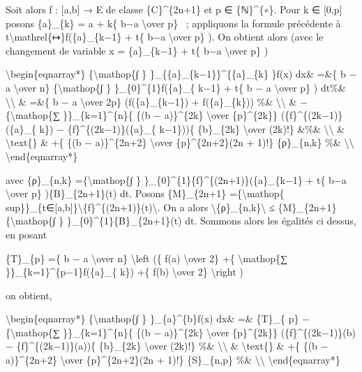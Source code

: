 \documentclass[]{article}
\begin{document}
Soit alors f : {[}a,b{]} → E de classe \{C\}\^{}\{2n+1\} et p ∈
\{ℕ\}\^{}\{∗\}. Pour k ∈ {[}0,p{]} posons \{a\}\_\{k\} = a + k\{ b−a
\textbackslash{}over p\} ~; appliquons la formule précédente à
t\textbackslash{}mathrel\{↦\}f(\{a\}\_\{k−1\} + t\{ b−a
\textbackslash{}over p\} ). On obtient alors (avec le changement de
variable x = \{a\}\_\{k−1\} + t\{ b−a \textbackslash{}over p\} )

\textbackslash{}begin\{eqnarray*\} \{\textbackslash{}mathop\{∫ \}
\}\_\{\{a\}\_\{k−1\}\}\^{}\{\{a\}\_\{k\} \}f(x) dx\& =\&\{ b − a
\textbackslash{}over n\} \{\textbackslash{}mathop\{∫ \}
\}\_\{0\}\^{}\{1\}f(\{a\}\_\{ k−1\} + t\{ b − a \textbackslash{}over p\}
) dt\%\& \textbackslash{}\textbackslash{} \& =\&\{ b − a
\textbackslash{}over 2p\} (f(\{a\}\_\{k−1\}) + f(\{a\}\_\{k\})) \%\&
\textbackslash{}\textbackslash{} \& −\{\textbackslash{}mathop\{∑
\}\}\_\{k=1\}\^{}\{n\}\{ \{(b − a)\}\^{}\{2k\} \textbackslash{}over
\{p\}\^{}\{2k\}\} (\{f\}\^{}\{(2k−1)\}(\{a\}\_\{ k\}) −
\{f\}\^{}\{(2k−1)\}(\{a\}\_\{ k−1\}))\{ \{b\}\_\{2k\}
\textbackslash{}over (2k)!\} \&\%\& \textbackslash{}\textbackslash{} \&
\textbackslash{}text\{\} \& +\{ \{(b − a)\}\^{}\{2n+2\}
\textbackslash{}over \{p\}\^{}\{2n+2\}(2n + 1)!\} \{ρ\}\_\{n,k\} \%\&
\textbackslash{}\textbackslash{} \textbackslash{}end\{eqnarray*\}

avec \{ρ\}\_\{n,k\} =\{\textbackslash{}mathop\{∫ \}
\}\_\{0\}\^{}\{1\}\{f\}\^{}\{(2n+1)\}(\{a\}\_\{k−1\} + t\{ b−a
\textbackslash{}over p\} )\{B\}\_\{2n+1\}(t) dt. Posons \{M\}\_\{2n+1\}
=\{\textbackslash{}mathop\{
sup\}\}\_\{t∈{[}a,b{]}\}\textbackslash{}\textbar{}\{f\}\^{}\{(2n+1)\}(t)\textbackslash{}\textbar{}.
On a alors
\textbackslash{}\textbar{}\{ρ\}\_\{n,k\}\textbackslash{}\textbar{} ≤
\{M\}\_\{2n+1\}\{\textbackslash{}mathop\{∫ \}
\}\_\{0\}\^{}\{1\}\textbar{}\{B\}\_\{2n+1\}(t)\textbar{} dt. Sommons
alors les égalités ci dessus, en posant

\{T\}\_\{p\} =\{ b − a \textbackslash{}over n\} \textbackslash{}left (\{
f(a) \textbackslash{}over 2\} +\{ \textbackslash{}mathop\{∑
\}\}\_\{k=1\}\^{}\{p−1\}f(\{a\}\_\{ k\}) +\{ f(b) \textbackslash{}over
2\} \textbackslash{}right )

on obtient,

\textbackslash{}begin\{eqnarray*\} \{\textbackslash{}mathop\{∫ \}
\}\_\{a\}\^{}\{b\}f(x) dx\& =\& \{T\}\_\{ p\}
−\{\textbackslash{}mathop\{∑ \}\}\_\{k=1\}\^{}\{n\}\{ \{(b −
a)\}\^{}\{2k\} \textbackslash{}over \{p\}\^{}\{2k\}\}
(\{f\}\^{}\{(2k−1)\}(b) − \{f\}\^{}\{(2k−1)\}(a))\{ \{b\}\_\{2k\}
\textbackslash{}over (2k)!\} \%\& \textbackslash{}\textbackslash{} \&
\textbackslash{}text\{\} \& +\{ \{(b − a)\}\^{}\{2n+2\}
\textbackslash{}over \{p\}\^{}\{2n+2\}(2n + 1)!\} \{S\}\_\{n,p\} \%\&
\textbackslash{}\textbackslash{} \textbackslash{}end\{eqnarray*\}
\end{document}
